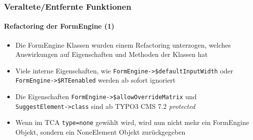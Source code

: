 %

\begin{frame}[fragile]
	\frametitle{Veraltete/Entfernte Funktionen}
	\framesubtitle{Refactoring der FormEngine (1)}

	\begin{itemize}

		\item Die FormEngine Klassen wurden einem Refactoring unterzogen, welches Auswirkungen
			auf Eigenschaften und Methoden der Klassen hat

		\item Viele interne Eigenschaften, wie \small\texttt{FormEngine->\$defaultInputWidth}\normalsize\space
			oder \small\texttt{FormEngine->\$RTEenabled}\normalsize\space
			werden ab sofort ignoriert

		\item Die Eigenschaften \small\texttt{FormEngine->\$allowOverrideMatrix}\normalsize\space
			und \small\texttt{SuggestElement->class}\normalsize\space
			sind ab TYPO3 CMS 7.2 \textit{protected}

		\item Wenn im TCA \texttt{type=none} gewählt wird, wird nun nicht mehr ein FormEngine
			Objekt, sondern ein NoneElement Objekt zurückgegeben

	\end{itemize}

\end{frame}


